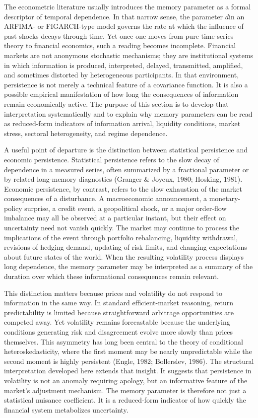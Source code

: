 \documentclass[12pt]{article}
\begin{document}
The econometric literature usually introduces the memory parameter as a formal descriptor of temporal dependence. In that narrow sense, the parameter $d$in an ARFIMA- or FIGARCH-type model governs the rate at which the influence of past shocks decays through time. Yet once one moves from pure time-series theory to financial economics, such a reading becomes incomplete. Financial markets are not anonymous stochastic mechanisms; they are institutional systems in which information is produced, interpreted, delayed, transmitted, amplified, and sometimes distorted by heterogeneous participants. In that environment, persistence is not merely a technical feature of a covariance function. It is also a possible empirical manifestation of how long the consequences of information remain economically active. The purpose of this section is to develop that interpretation systematically and to explain why memory parameters can be read as reduced-form indicators of information arrival, liquidity conditions, market stress, sectoral heterogeneity, and regime dependence.

A useful point of departure is the distinction between statistical persistence and economic persistence. Statistical persistence refers to the slow decay of dependence in a measured series, often summarized by a fractional parameter or by related long-memory diagnostics (Granger \& Joyeux, 1980; Hosking, 1981). Economic persistence, by contrast, refers to the slow exhaustion of the market consequences of a disturbance. A macroeconomic announcement, a monetary-policy surprise, a credit event, a geopolitical shock, or a major order-flow imbalance may all be observed at a particular instant, but their effect on uncertainty need not vanish quickly. The market may continue to process the implications of the event through portfolio rebalancing, liquidity withdrawal, revisions of hedging demand, updating of risk limits, and changing expectations about future states of the world. When the resulting volatility process displays long dependence, the memory parameter may be interpreted as a summary of the duration over which these informational consequences remain relevant.

This distinction matters because prices and volatility do not respond to information in the same way. In standard efficient-market reasoning, return predictability is limited because straightforward arbitrage opportunities are competed away. Yet volatility remains forecastable because the underlying conditions generating risk and disagreement evolve more slowly than prices themselves. This asymmetry has long been central to the theory of conditional heteroskedasticity, where the first moment may be nearly unpredictable while the second moment is highly persistent (Engle, 1982; Bollerslev, 1986). The structural interpretation developed here extends that insight. It suggests that persistence in volatility is not an anomaly requiring apology, but an informative feature of the market's adjustment mechanism. The memory parameter is therefore not just a statistical nuisance coefficient. It is a reduced-form indicator of how quickly the financial system metabolizes uncertainty.
\end{document}
